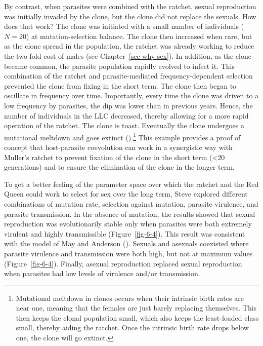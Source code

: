 \documentclass[
  american,
  letterpaper,
]{book}
\begin{document}
By contrast, when parasites were combined with the ratchet, sexual
reproduction was initially invaded by the clone, but the clone did not
replace the sexuals. How does that work? The clone was initiated with a
small number of individuals (\(N = 20\)) at mutation-selection balance.
The clone then increased when rare, but as the clone spread in the
population, the ratchet was already working to reduce the two-fold cost
of males (see Chapter~\ref{sec-why-sex}). In addition, as the clone
became common, the parasite population rapidly evolved to infect it.
This combination of the ratchet and parasite-mediated
frequency-dependent selection prevented the clone from fixing in the
short term. The clone then began to oscillate in frequency over time.
Importantly, every time the clone was driven to a low frequency by
parasites, the dip was lower than in previous years. Hence, the number
of individuals in the LLC decreased, thereby allowing for a more rapid
operation of the ratchet. The clone is toast. Eventually the clone
undergoes a mutational meltdown and goes extinct
().\footnote{Mutational
  meltdown in clones occurs when their intrinsic birth rates are near
  one, meaning that the females are just barely replacing themselves.
  This then keeps the clonal population small, which also keeps the
  least-loaded class small, thereby aiding the ratchet. Once the
  intrinsic birth rate drops below one, the clone will go extinct.} This
example provides a proof of concept that host-parasite coevolution can
work in a synergistic way with Muller's ratchet to prevent fixation of
the clone in the short term (\textless20 generations) and to ensure the
elimination of the clone in the longer term.

To get a better feeling of the parameter space over which the ratchet
and the Red Queen could work to select for sex over the long term, Steve
explored different combinations of mutation rate, selection against
mutation, parasite virulence, and parasite transmission. In the absence
of mutation, the results showed that sexual reproduction was
evolutionarily stable only when parasites were both extremely virulent
and highly transmissible (Figure~\ref{fig-6-4}). This result was
consistent with the model of May and Anderson
(). Sexuals and asexuals coexisted where
parasite virulence and transmission were both high, but not at maximum
values (Figure~\ref{fig-6-4}). Finally, asexual reproduction replaced
sexual reproduction when parasites had low levels of virulence and/or
transmission.
\end{document}

